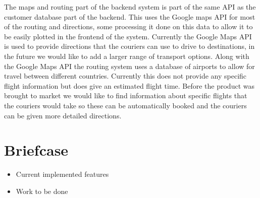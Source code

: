 The maps and routing part of the backend system is part of the same API as the customer database part of the backend. This uses the Google maps API \cite{MapsAPI} for most of the routing and directions, some processing it done on this data to allow it to be easily plotted in the frontend of the system. Currently the Google Maps API is used to provide directions that the couriers can use to drive to destinations, in the future we would like to add a larger range of transport options. Along with the Google Maps API the routing system uses a database of airports \cite{AirpotFile} to allow for travel between different countries. Currently this does not provide any specific flight information but does give an estimated flight time. Before the product was brought to market we would like to find information about specific flights that the couriers would take so these can be automatically booked and the couriers can be given more detailed directions.

\section{Briefcase}

\begin{itemize}
    \item Current implemented features
    \item Work to be done
\end{itemize}